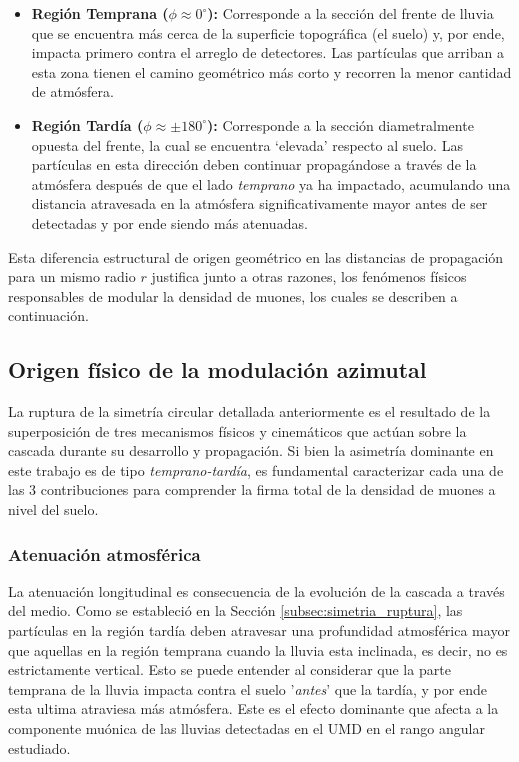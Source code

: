 \begin{itemize}
	\item \textbf{Región Temprana ($\phi \approx 0^\circ$):} Corresponde a la sección del frente de lluvia que se encuentra más cerca de la superficie topográfica (el suelo) y, por ende, impacta primero contra el arreglo de detectores. Las partículas que arriban a esta zona tienen el camino geométrico más corto y recorren la menor cantidad de atmósfera.
	\item \textbf{Región Tardía ($\phi \approx \pm 180^\circ$):} Corresponde a la sección diametralmente opuesta del frente, la cual se encuentra `elevada' respecto al suelo. Las partículas en esta dirección deben continuar propagándose a través de la atmósfera después de que el lado \textit{temprano} ya ha impactado, acumulando una distancia atravesada en la atmósfera significativamente mayor antes de ser detectadas y por ende siendo más atenuadas.
\end{itemize}

Esta diferencia estructural de origen geométrico en las distancias de propagación para un mismo radio $r$ justifica junto a otras razones, los fenómenos físicos responsables de modular la densidad de muones, los cuales se describen a continuación.

\subsection{Origen físico de la modulación azimutal}
\label{subsec:origen_fisico}

La ruptura de la simetría circular detallada anteriormente es el resultado de la superposición de tres mecanismos físicos y cinemáticos que actúan sobre la cascada durante su desarrollo y propagación.  Si bien la asimetría dominante en este trabajo es de tipo \textit{temprano-tardía}, es fundamental caracterizar cada una de las 3 contribuciones \cite{GAP2007_124} para comprender la firma total de la densidad de muones a nivel del suelo.

\subsubsection{Atenuación atmosférica}
\label{subsubsec:atenuacion}

La atenuación longitudinal es consecuencia de la evolución de la cascada a través del medio. Como se estableció en la Sección \ref{subsec:simetria_ruptura}, las partículas en la región tardía deben atravesar una profundidad atmosférica mayor que aquellas en la región temprana cuando la lluvia esta inclinada, es decir, no es estrictamente vertical. Esto se puede entender al considerar que la parte temprana de la lluvia impacta contra el suelo '\textit{antes}' que la tardía, y por ende esta ultima atraviesa más atmósfera. Este es el efecto dominante que afecta a la componente muónica de las lluvias detectadas en el UMD en el rango angular estudiado.

